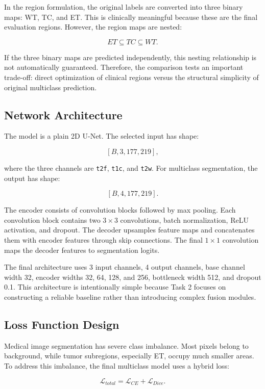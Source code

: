 In the region formulation, the original labels are converted into three binary maps: WT, TC, and ET. This is clinically meaningful because these are the final evaluation regions. However, the region maps are nested:

\[
ET \subseteq TC \subseteq WT.
\]

If the three binary maps are predicted independently, this nesting relationship is not automatically guaranteed. Therefore, the comparison tests an important trade-off: direct optimization of clinical regions versus the structural simplicity of original multiclass prediction.

\subsection{Network Architecture}

The model is a plain 2D U-Net. The selected input has shape:

\[
[B,3,177,219],
\]

where the three channels are \texttt{t2f}, \texttt{t1c}, and \texttt{t2w}. For multiclass segmentation, the output has shape:

\[
[B,4,177,219].
\]

The encoder consists of convolution blocks followed by max pooling. Each convolution block contains two \(3 \times 3\) convolutions, batch normalization, ReLU activation, and dropout. The decoder upsamples feature maps and concatenates them with encoder features through skip connections. The final \(1 \times 1\) convolution maps the decoder features to segmentation logits.

The final architecture uses 3 input channels, 4 output channels, base channel width 32, encoder widths 32, 64, 128, and 256, bottleneck width 512, and dropout 0.1. This architecture is intentionally simple because Task 2 focuses on constructing a reliable baseline rather than introducing complex fusion modules.

\subsection{Loss Function Design}

Medical image segmentation has severe class imbalance. Most pixels belong to background, while tumor subregions, especially ET, occupy much smaller areas. To address this imbalance, the final multiclass model uses a hybrid loss:

\[
\mathcal{L}_{total} =
\mathcal{L}_{CE} + \mathcal{L}_{Dice}.
\]

